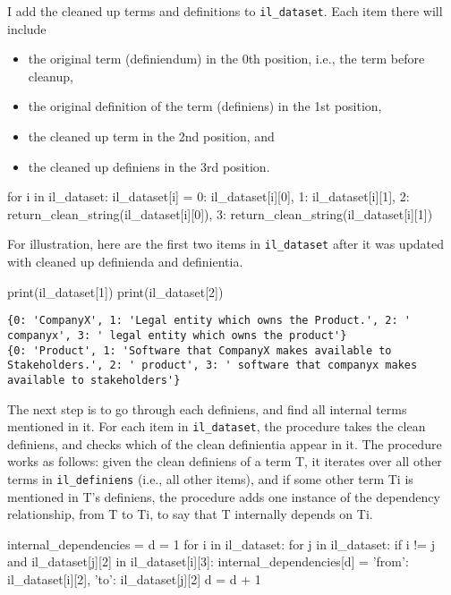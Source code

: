 I add the cleaned up terms and definitions to \verb|il_dataset|. Each item there will include
\begin{itemize}
	\item the original term (definiendum) in the 0th position, i.e., the term before cleanup,
	\item the original definition of the term (definiens) in the 1st position,
	\item the cleaned up term in the 2nd position, and
	\item the cleaned up definiens in the 3rd position.
\end{itemize}

\begin{pycode}
for i in il_dataset:
    il_dataset[i] = { 
        0: il_dataset[i][0],
        1: il_dataset[i][1],
        2: return_clean_string(il_dataset[i][0]),
        3: return_clean_string(il_dataset[i][1])
        }
\end{pycode}

For illustration, here are the first two items in \verb|il_dataset| after it was updated with cleaned up definienda and definientia.

\begin{pycode}
print(il_dataset[1])
print(il_dataset[2])
\end{pycode}

\begin{lstlisting}[breaklines]
{0: 'CompanyX', 1: 'Legal entity which owns the Product.', 2: ' companyx', 3: ' legal entity which owns the product'}
{0: 'Product', 1: 'Software that CompanyX makes available to Stakeholders.', 2: ' product', 3: ' software that companyx makes available to stakeholders'}
\end{lstlisting}

The next step is to go through each definiens, and find all internal terms mentioned in it. For each item in \verb|il_dataset|, the procedure takes the clean definiens, and checks which of the clean definientia appear in it. The procedure works as follows: given the clean definiens of a term T, it iterates over all other terms in \verb|il_definiens| (i.e., all other items), and if some other term Ti is mentioned in T's definiens, the procedure adds one instance of the dependency relationship, from T to Ti, to say that T internally depends on Ti.

\begin{pycode}
internal_dependencies = {}
d = 1
for i in il_dataset:
    for j in il_dataset:
        if i != j and il_dataset[j][2] in il_dataset[i][3]:
            internal_dependencies[d] = {
                'from': il_dataset[i][2], 'to': il_dataset[j][2]
            }
            d = d + 1
\end{pycode}

